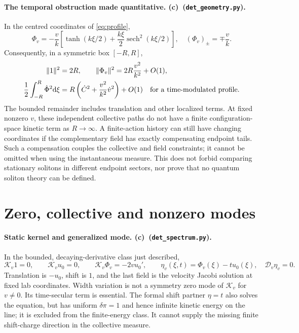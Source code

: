 \documentclass[11pt,a4paper]{article}
\newcommand{\Lc}{\textbf{(c)}}
\newcommand{\G}{\texttt{det\_geometry.py}}
\newcommand{\Scheck}{\texttt{det\_spectrum.py}}
\newcommand{\dd}{\mathrm d}
\begin{document}
\paragraph{The temporal obstruction made quantitative. \Lc\ (\G).}
In the centred coordinates of \eqref{eq:profile},
\begin{equation}
 \Phi_v=-\frac vk\left[\tanh(k\xi/2)
                  +\frac{k\xi}{2}\operatorname{sech}^2(k\xi/2)\right],
 \quad (\Phi_v)_\pm=\mp\frac vk.
\end{equation}
Consequently, in a symmetric box $[-R,R]$,
\begin{align}
 \|1\|^2&=2R,\qquad
 \|\Phi_v\|^2=2R\frac{v^2}{k^2}+O(1),\\
 \frac12\int_{-R}^R\dot\Phi^2\dd\xi
  &=R\left(\dot C^2+\frac{v^2}{k^2}\dot v^2\right)+O(1)
  \quad\hbox{for a time-modulated profile.}\label{eq:norm}
\end{align}
The bounded remainder includes translation and other localized terms.
At fixed nonzero $v$, these independent collective paths do not have a finite
configuration-space kinetic term as $R\to\infty$. A finite-action history
can still have changing coordinates if the complementary field has exactly
compensating endpoint tails. Such a compensation couples the collective and
field constraints; it cannot be omitted when using the instantaneous measure.
This does not forbid comparing stationary solitons in different endpoint
sectors, nor prove that no quantum soliton theory can be defined.

\section{Zero, collective and nonzero modes}
\paragraph{Static kernel and generalized mode. \Lc\ (\Scheck).}
In the bounded, decaying-derivative class just described,
\begin{equation}
 \mathcal K_v1=0,\qquad \mathcal K_vu_0=0,\qquad
 \mathcal K_v\Phi_v=-2vu_0',\qquad
 \eta_v(\xi,t)=\Phi_v(\xi)-t u_0(\xi),\quad
 \mathcal D_v\eta_v=0.\label{eq:jacobi}
\end{equation}
Translation is $-u_0$, shift is $1$, and the last field is the velocity
Jacobi solution at fixed lab coordinates. Width variation is not a symmetry
zero mode of $\mathcal K_v$ for $v\ne0$. Its time-secular term is essential.
The formal shift partner $\eta=t$ also solves the equation, but has uniform
$\delta\pi=1$ and hence infinite kinetic energy on the line; it is excluded
from the finite-energy class. It cannot supply the missing finite shift-charge
direction in the collective measure.
\end{document}
